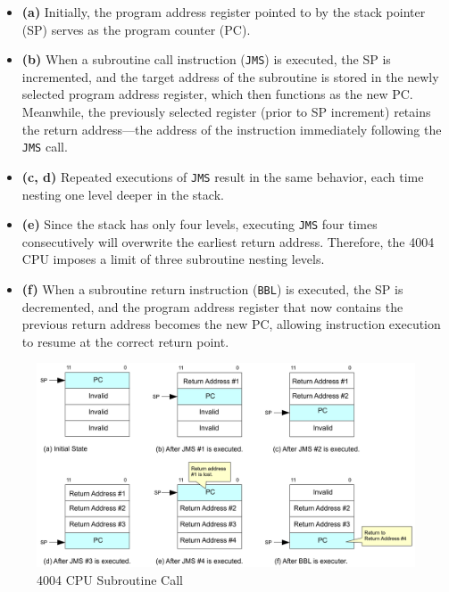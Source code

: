 \begin{itemize}
  \item \textbf{(a)} Initially, the program address register pointed to by the stack pointer (SP) serves as the program counter (PC).
  
  \item \textbf{(b)} When a subroutine call instruction (\texttt{JMS}) is executed, the SP is incremented, and the target address of the subroutine is stored in the newly selected program address register, which then functions as the new PC. Meanwhile, the previously selected register (prior to SP increment) retains the return address—the address of the instruction immediately following the \texttt{JMS} call.
  
  \item \textbf{(c, d)} Repeated executions of \texttt{JMS} result in the same behavior, each time nesting one level deeper in the stack.
  
  \item \textbf{(e)} Since the stack has only four levels, executing \texttt{JMS} four times consecutively will overwrite the earliest return address. Therefore, the 4004 CPU imposes a limit of three subroutine nesting levels.
  
  \item \textbf{(f)} When a subroutine return instruction (\texttt{BBL}) is executed, the SP is decremented, and the program address register that now contains the previous return address becomes the new PC, allowing instruction execution to resume at the correct return point.
\end{itemize}

\begin{figure}[htbp]
    \includegraphics[width=1.0\columnwidth]{./Figure/CPUSubroutineCall.png}
    \caption{4004 CPU Subroutine Call}
    \label{fig:CPUSUBROUTINECALL}
\end{figure}

